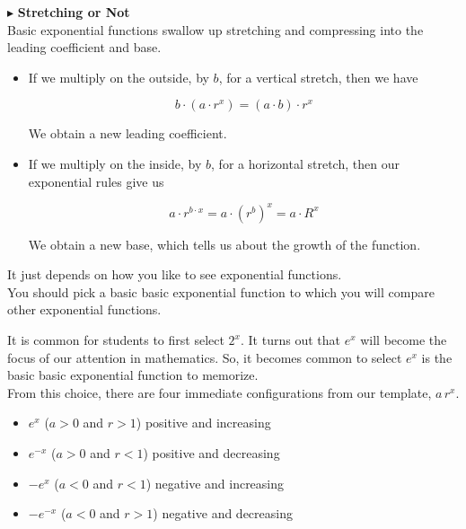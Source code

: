 \documentclass{ximera}
\begin{document}
$\blacktriangleright$ \textbf{\textcolor{blue!55!black}{Stretching or Not}} \\



Basic exponential functions swallow up stretching and compressing into the leading coefficient and base.


\begin{itemize}
\item If we multiply on the outside, by $b$, for a vertical stretch, then we have

\[
b \cdot (a \cdot r^x) = (a \cdot b) \cdot r^x
\]

We obtain a new leading coefficient. \\






\item If we multiply on the inside, by $b$, for a horizontal stretch, then our exponential rules give us

\[
a \cdot r^{b \cdot x} = a \cdot (r^b)^x = a \cdot R^x
\]

We obtain a new base, which tells us about the growth of the function.


\end{itemize}


It just depends on how you like to see exponential functions. \\



You should pick a basic basic exponential function to which you will compare other exponential functions.

It is common for students to first select $2^x$. It turns out that $e^x$ will become the focus of our attention in mathematics.  So, it becomes common to select $e^x$ is the basic basic exponential function to memorize. \\


From this choice, there are four immediate configurations from our template, $a \, r^x$.\\




\begin{itemize}
\item  $e^x$ ($a>0$ and $r>1$) positive and increasing
\item  $e^{-x}$ ($a>0$ and $r<1$) positive and decreasing
\item  $-e^x$ ($a<0$ and $r<1$) negative and increasing
\item  $-e^{-x}$ ($a<0$ and $r>1$) negative and decreasing
\end{itemize}
\end{document}
